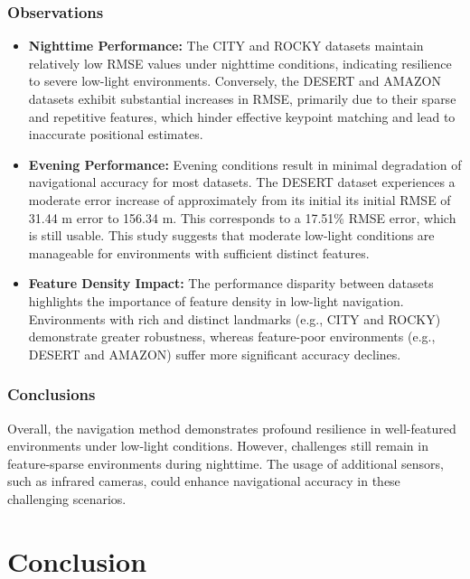 \subsubsection{Observations}

\begin{itemize}
    \item \textbf{Nighttime Performance:} The CITY and ROCKY datasets maintain relatively low RMSE values under nighttime conditions, indicating resilience to severe low-light environments. Conversely, the DESERT and AMAZON datasets exhibit substantial increases in RMSE, primarily due to their sparse and repetitive features, which hinder effective keypoint matching and lead to inaccurate positional estimates.
    
    
    \item \textbf{Evening Performance:} Evening conditions result in minimal degradation of navigational accuracy for most datasets. The DESERT dataset experiences a moderate error increase of approximately from its initial its initial RMSE of 31.44 m error to 156.34 m. This corresponds to a 17.51\% RMSE error, which is still usable. This study suggests that moderate low-light conditions are manageable for environments with sufficient distinct features.
    
    \item \textbf{Feature Density Impact:} The performance disparity between datasets highlights the importance of feature density in low-light navigation. Environments with rich and distinct landmarks (e.g., CITY and ROCKY) demonstrate greater robustness, whereas feature-poor environments (e.g., DESERT and AMAZON) suffer more significant accuracy declines.
\end{itemize}

\subsubsection{Conclusions}


Overall, the navigation method demonstrates profound resilience in well-featured environments under low-light conditions. However, challenges still remain in feature-sparse environments during nighttime. The usage of additional sensors, such as infrared cameras, could enhance navigational accuracy in these challenging scenarios. 



\section{Conclusion}

